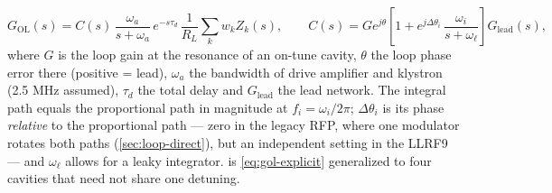 \begin{equation}\label{eq:rob-loop}
G_\text{OL}(s) = C(s)\,\frac{\omega_a}{s + \omega_a}\,e^{-s\tau_d}\,\frac{1}{R_L}\sum_k w_k Z_k(s),
\qquad
C(s) = G e^{j\theta}\left[1 + e^{j\Delta\theta_i}\,\frac{\omega_i}{s + \omega_\ell}\right] G_\text{lead}(s),
\end{equation}
where \(G\) is the loop gain at the resonance of an on-tune cavity, \(\theta\) the loop phase error there (positive = lead), \(\omega_a\) the bandwidth of drive amplifier and klystron (2.5 MHz assumed), \(\tau_d\) the total delay and \(G_\text{lead}\) the lead network. The integral path equals the proportional path in magnitude at \(f_i = \omega_i/2\pi\); \(\Delta\theta_i\) is its phase \emph{relative} to the proportional path --- zero in the legacy RFP, where one modulator rotates both paths (\cref{sec:loop-direct}), but an independent setting in the LLRF9 --- and \(\omega_\ell\) allows for a leaky integrator.  is \cref{eq:gol-explicit} generalized to four cavities that need not share one detuning.

